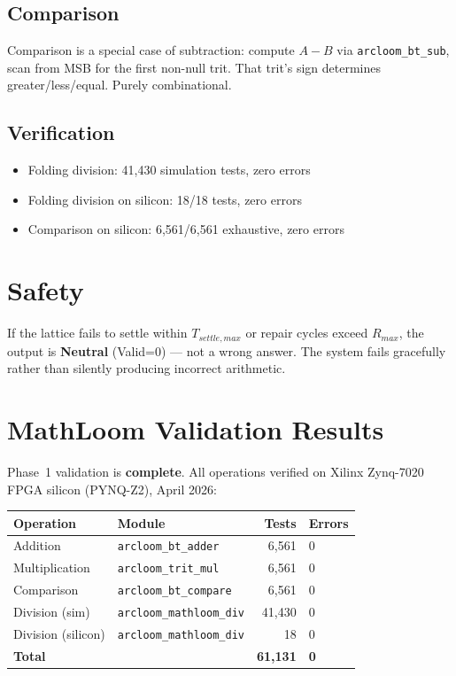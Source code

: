 \documentclass[11pt, a4paper]{report}
\begin{document}
\subsection{Comparison}

Comparison is a special case of subtraction: compute $A - B$ via
\texttt{arcloom\_bt\_sub}, scan from MSB for the first non-null trit.
That trit's sign determines greater/less/equal. Purely combinational.

\subsection{Verification}

\begin{itemize}[nosep]
  \item Folding division: 41,430 simulation tests, zero errors
  \item Folding division on silicon: 18/18 tests, zero errors
  \item Comparison on silicon: 6,561/6,561 exhaustive, zero errors
\end{itemize}

\section{Safety}

If the lattice fails to settle within $T_{settle,max}$ or repair cycles
exceed $R_{max}$, the output is \textbf{Neutral} (Valid=0) --- not a
wrong answer. The system fails gracefully rather than silently producing
incorrect arithmetic.

\section{MathLoom Validation Results}

Phase~1 validation is \textbf{complete}. All operations verified on
Xilinx Zynq-7020 FPGA silicon (PYNQ-Z2), April 2026:

\begin{longtable}{@{}llrl@{}}
\toprule
\textbf{Operation} & \textbf{Module} & \textbf{Tests} & \textbf{Errors} \\
\midrule
\endhead
Addition       & \texttt{arcloom\_bt\_adder}   & 6,561  & 0 \\
Multiplication & \texttt{arcloom\_trit\_mul}    & 6,561  & 0 \\
Comparison     & \texttt{arcloom\_bt\_compare}  & 6,561  & 0 \\
Division (sim) & \texttt{arcloom\_mathloom\_div} & 41,430 & 0 \\
Division (silicon) & \texttt{arcloom\_mathloom\_div} & 18 & 0 \\
\midrule
\textbf{Total} & & \textbf{61,131} & \textbf{0} \\
\bottomrule
\end{longtable}
\end{document}
